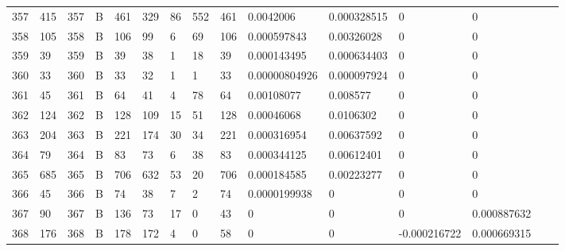 \begin{longtable}{lllllllllllllll}
	357 & 415               & 357 & B   & 461               & 329               & 86                & 552  & 461        & 0.0042006      & 0.000328515    & 0             & 0            \\
	358 & 105               & 358 & B   & 106               & 99                & 6                 & 69   & 106        & 0.000597843    & 0.00326028     & 0             & 0            \\
	359 & 39                & 359 & B   & 39                & 38                & 1                 & 18   & 39         & 0.000143495    & 0.000634403    & 0             & 0            \\
	360 & 33                & 360 & B   & 33                & 32                & 1                 & 1    & 33         & 0.00000804926  & 0.000097924    & 0             & 0            \\
	361 & 45                & 361 & B   & 64                & 41                & 4                 & 78   & 64         & 0.00108077     & 0.008577       & 0             & 0            \\
	362 & 124               & 362 & B   & 128               & 109               & 15                & 51   & 128        & 0.00046068     & 0.0106302      & 0             & 0            \\
	363 & 204               & 363 & B   & 221               & 174               & 30                & 34   & 221        & 0.000316954    & 0.00637592     & 0             & 0            \\
	364 & 79                & 364 & B   & 83                & 73                & 6                 & 38   & 83         & 0.000344125    & 0.00612401     & 0             & 0            \\
	365 & 685               & 365 & B   & 706               & 632               & 53                & 20   & 706        & 0.000184585    & 0.00223277     & 0             & 0            \\
	366 & 45                & 366 & B   & 74                & 38                & 7                 & 2    & 74         & 0.0000199938   & 0              & 0             & 0            \\
	367 & 90                & 367 & B   & 136               & 73                & 17                & 0    & 43         & 0              & 0              & 0             & 0.000887632  \\
	368 & 176               & 368 & B   & 178               & 172               & 4                 & 0    & 58         & 0              & 0              & -0.000216722  & 0.000669315  \\

\end{longtable}
